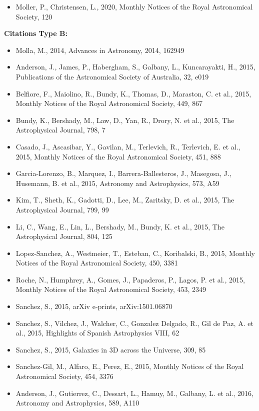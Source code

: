 \documentclass{letter}
\begin{document}
\begin{enumerate}
\begin{itemize}
\item Moller, P., Christensen, L., 2020, Monthly Notices of the Royal Astronomical Society, 120
\end{itemize}
{\bf Citations Type B:}
\begin{itemize}
\item Molla, M., 2014, Advances in Astronomy, 2014, 162949
\item Anderson, J., James, P., Habergham, S., Galbany, L., Kuncarayakti, H., 2015, Publications of the Astronomical Society of Australia, 32, e019
\item Belfiore, F., Maiolino, R., Bundy, K., Thomas, D., Maraston, C. et al., 2015, Monthly Notices of the Royal Astronomical Society, 449, 867
\item Bundy, K., Bershady, M., Law, D., Yan, R., Drory, N. et al., 2015, The Astrophysical Journal, 798, 7
\item Casado, J., Ascasibar, Y., Gavilan, M., Terlevich, R., Terlevich, E. et al., 2015, Monthly Notices of the Royal Astronomical Society, 451, 888
\item Garcia-Lorenzo, B., Marquez, I., Barrera-Ballesteros, J., Masegosa, J., Husemann, B. et al., 2015, Astronomy and Astrophysics, 573, A59
\item Kim, T., Sheth, K., Gadotti, D., Lee, M., Zaritsky, D. et al., 2015, The Astrophysical Journal, 799, 99
\item Li, C., Wang, E., Lin, L., Bershady, M., Bundy, K. et al., 2015, The Astrophysical Journal, 804, 125
\item Lopez-Sanchez, A., Westmeier, T., Esteban, C., Koribalski, B., 2015, Monthly Notices of the Royal Astronomical Society, 450, 3381
\item Roche, N., Humphrey, A., Gomes, J., Papaderos, P., Lagos, P. et al., 2015, Monthly Notices of the Royal Astronomical Society, 453, 2349
\item Sanchez, S., 2015, arXiv e-prints, arXiv:1501.06870
\item Sanchez, S., Vilchez, J., Walcher, C., Gonzalez Delgado, R., Gil de Paz, A. et al., 2015, Highlights of Spanish Astrophysics VIII, 62
\item Sanchez, S., 2015, Galaxies in 3D across the Universe, 309, 85
\item Sanchez-Gil, M., Alfaro, E., Perez, E., 2015, Monthly Notices of the Royal Astronomical Society, 454, 3376
\item Anderson, J., Gutierrez, C., Dessart, L., Hamuy, M., Galbany, L. et al., 2016, Astronomy and Astrophysics, 589, A110

\end{itemize}
\end{enumerate}
\end{document}
